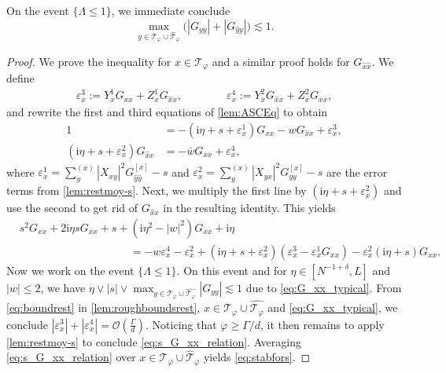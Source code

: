 \documentclass[11pt]{article}
\newcommand{\ii}{\mathrm{i}}
\newcommand{\abs}[1]{\left| #1 \right|}
\newcommand{\eps}{\varepsilon}
\theoremstyle{plain}
\theoremstyle{remark}
\numberwithin{equation}{section}
\newcommand*\barr[1]{\overline{#1}}
\newcommand*\bset[1]{[#1]}
\newcommand*\ubarr[1]{{\widehat{#1}}}
\begin{document}
	On the event $\{ \Lambda \leq 1 \}$, we immediate conclude 
	\begin{equation} \label{eq:G_xx_typical} 
	\max_{y \in  \mathcal T_{\varphi} \cup \ubarr{\mathcal T}_{\varphi}} \big( \abs{G_{yy}} + \abs{G_{\ubarr{y}y}} \big) \lesssim 1. 
	\end{equation}
	\begin{proof}%
		We prove the inequality for $x \in \mathcal{T}_{\varphi} $ and a similar proof holds for $G_{\ubarr{x}\ubarr{x}}$. We define 
		\begin{align*}
			\eps^3_x := Y_{x}^1 G_{xx} + Z^{1}_{x} G_{\ubarr{x}x}, \qquad \qquad  \eps^4_x := Y_{x}^2 G_{\ubarr{x}x} + Z^{2}_{x} G_{xx}, 
		\end{align*}
		and rewrite the first and third equations of \cref{lem:ASCEq}  to obtain 
		\begin{align*}
			1 &= - (\ii\eta +s+ \eps_{x}^1) G_{xx} - w G_{\ubarr{x}x} + \eps_x^3,\\
			(\ii\eta  + s + \eps^2_{x}) G_{\ubarr{x}x} &= -\barr{w}G_{xx} + \eps_{x}^4,
		\end{align*}
		where $\eps_{x}^1 = \sum_{y}^{(x)} \abs{X_{xy}}^2G_{\ubarr{y}\ubarr{y}}^{\bset{x}} - s$ and $\eps_{x}^2 = \sum_{y}^{(x)} \abs{X_{yx}}^2G_{yy}^{\bset{x}} - s$ are the error terms from \cref{lem:restmoy-s}. Next, we multiply the first line by $(\ii\eta +  s + \eps^2_{x})$ and use the second to get rid 
		of $G_{\ubarr{x}x}$ in the resulting identity. This yields  
		\begin{equation}\label{eq:Giifunctionofs}
			\begin{aligned}
				& s^2 G_{xx} + 2\ii\eta s G_{xx} + s + (\ii\eta ^2 - \abs{w}^2) G_{xx} + \ii\eta  \\ 
				& \qquad \qquad\qquad \qquad \qquad 	=- w \eps_{x}^4 - \eps_{x}^2  + (\ii\eta +s+\eps_{x}^2)(\eps_{x}^3 - \eps_{x}^1G_{xx}) - \eps_{x}^2(\ii\eta +s) G_{xx}.
			\end{aligned} 
		\end{equation}
		Now we work on the event $ \{\Lambda \leq 1\}$. On this event and for $\eta \in [N^{-1+ \delta},L]$ and $\abs{w} \le 2$, we have $\eta\vee \abs{s} \vee \max_{y \in \mathcal T_{\varphi} \cup \widehat{\mathcal T_{\varphi}}} \abs{G_{yy}} \lesssim 1$ due to \cref{eq:G_xx_typical}.  
		From \eqref{eq:boundrest} in \cref{lem:roughboundsrest}, $x \in \mathcal T_{\varphi} \cup \widehat{\mathcal T_{\varphi}}$ and \cref{eq:G_xx_typical}, we conclude $\abs{\eps_{x}^3}+\abs{\eps_{x}^4}= \mathcal{O} (  \frac{\Gamma}{d} )$.
		Noticing that $\varphi \ge \Gamma/d$, it then remains to apply \cref{lem:restmoy-s} to conclude \eqref{eq:s_G_xx_relation}. 
		Averaging \eqref{eq:s_G_xx_relation} over $x \in \mathcal T_{\varphi} \cup \ubarr{\mathcal T}_\varphi$ yields \eqref{eq:stabfors}. 
	\end{proof}
	
\end{document}
